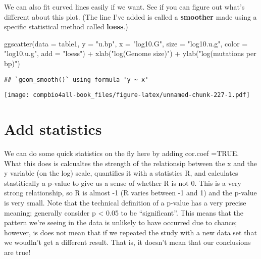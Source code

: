 \documentclass[
]{book}
\newenvironment{Shaded}{\begin{snugshade}}{\end{snugshade}}
\newcommand{\AttributeTok}[1]{\textcolor[rgb]{0.77,0.63,0.00}{#1}}
\newcommand{\FunctionTok}[1]{\textcolor[rgb]{0.00,0.00,0.00}{#1}}
\newcommand{\NormalTok}[1]{#1}
\newcommand{\SpecialCharTok}[1]{\textcolor[rgb]{0.00,0.00,0.00}{#1}}
\newcommand{\StringTok}[1]{\textcolor[rgb]{0.31,0.60,0.02}{#1}}
\begin{document}
We can also fit curved lines easily if we want. See if you can figure out what's different about this plot. (The line I've added is called a \textbf{smoother} made using a specific statistical method called \textbf{loess}.)

\begin{Shaded}
\begin{Highlighting}[]
\FunctionTok{ggscatter}\NormalTok{(}\AttributeTok{data =}\NormalTok{ table1,}
          \AttributeTok{y =} \StringTok{"u.bp"}\NormalTok{,}
          \AttributeTok{x =} \StringTok{"log10.G"}\NormalTok{,}
          \AttributeTok{size =} \StringTok{"log10.u.g"}\NormalTok{,   }
          \AttributeTok{color =} \StringTok{"log10.u.g"}\NormalTok{,}
          \AttributeTok{add =} \StringTok{"loess"}\NormalTok{) }\SpecialCharTok{+}
  \FunctionTok{xlab}\NormalTok{(}\StringTok{"log(Genome size)"}\NormalTok{)     }\SpecialCharTok{+}
  \FunctionTok{ylab}\NormalTok{(}\StringTok{"log(mutations per bp)"}\NormalTok{)}
\end{Highlighting}
\end{Shaded}

\begin{verbatim}
## `geom_smooth()` using formula 'y ~ x'
\end{verbatim}

\texttt{[image: compbio4all-book\_files/figure-latex/unnamed-chunk-227-1.pdf]}

\hypertarget{add-statistics}{%
\section{Add statistics}\label{add-statistics}}

We can do some quick statistics on the fly here by adding cor.coef =TRUE. What this does is calcualtes the strength of the relationsip between the x and the y variable (on the log) scale, quantifies it with a statistics R, and calculates stastitically a p-value to give us a sense of whether R is not 0. This is a very strong relationship, so R is almost -1 (R varies between -1 and 1) and the p-value is very small. Note that the technical definition of a p-value has a very precise meaning; generally consider p \textless{} 0.05 to be ``significant''. This means that the pattern we're seeing in the data is unlikely to have occurred due to chance; however, is does not mean that if we repeated the study with a new data set that we woudln't get a different result. That is, it doesn't mean that our conclusions are true!
\end{document}
